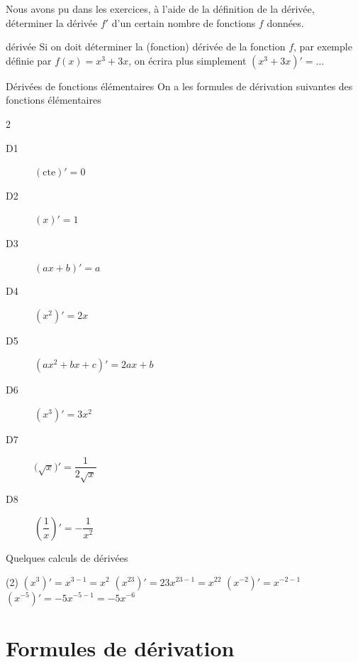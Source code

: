 \documentclass[a4paper,12pt]{article}
\begin{document}
\begin{autre}
	\tcblower
Nous avons pu dans les exercices, à l'aide de la définition de la dérivée, déterminer la dérivée $f'$ d'un certain nombre de fonctions $f$ données.
\end{autre}

\begin{notation}
dérivée
\tcblower
Si on doit déterminer la (fonction) dérivée de la fonction $f$, par exemple définie par $f(x)=x^3+3x$, on écrira plus simplement $(x^3+3x)'=\ldots$
\end{notation}


\begin{formule}
Dérivées de fonctions élémentaires
	\tcblower
	On a les formules de dérivation suivantes des fonctions élémentaires
	\begin{multicols}{2}
	\begin{description}
  \item[D1] $(\text{cte})'=0$
  \item[D2] $(x)'=1$
  \item[D3] $(ax+b)'=a$
  \item[D4] $(x^2)'=2x$
  \item[D5] $(ax^2+bx+c)'=2ax+b$
  \item[D6] $(x^3)'=3x^2$
  \item[D7] $\bigl(\sqrt{x}\bigr)'=\dfrac{1}{2\sqrt{x}}$
  \item[D8] $\left(\dfrac{1}{x}\right)'=-\dfrac{1}{x^2}$
\end{description}
\end{multicols}
\end{formule}
\begin{exemple}
	Quelques calculs de dérivées
	\tcblower
	\begin{tasks}(2)
		\task $(x^3)'=x^{3-1}=x^2$ 
		\task $(x^{23})'=23x^{23-1}=x^{22}$
		\task $(x^{-2})'=x^{-2-1}$
		\task $(x^{-5})'=-5x^{-5-1}=-5x^{-6}$
	\end{tasks}

\end{exemple}

\section{Formules de dérivation}
\end{document}
